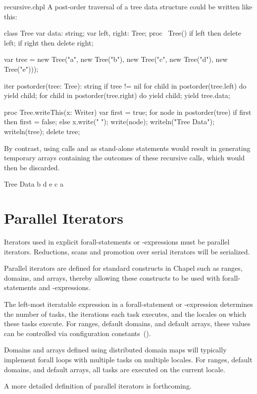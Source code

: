 \begin{chapelexample}{recursive.chpl}
A post-order traversal of a tree data structure could be written like this:
\begin{chapelnoprint}
class Tree {
  var data: string;
  var left, right: Tree;
  proc ~Tree() {
    if left then delete left;
    if right then delete right;
  }
}

var tree = new Tree("a", new Tree("b"), new Tree("c", new Tree("d"), new Tree("e")));
\end{chapelnoprint}
\begin{chapel}
iter postorder(tree: Tree): string {
  if tree != nil {
    for child in postorder(tree.left) do
      yield child;
    for child in postorder(tree.right) do
      yield child;
    yield tree.data;
  }
}
\end{chapel}
\begin{chapelnoprint}
proc Tree.writeThis(x: Writer)
{
  var first = true;
  for node in postorder(tree) {
    if first then first = false;
      else x.write(" ");
    write(node);
  }
}
writeln("Tree Data");
writeln(tree);
delete tree;
\end{chapelnoprint}
By contrast, using calls 
and  as stand-alone statements would
result in generating temporary arrays containing the outcomes of these
recursive calls, which would then be discarded.
\begin{chapeloutput}
Tree Data
b d e c a
\end{chapeloutput}
\end{chapelexample}

\section{Parallel Iterators}
\label{Parallel_Iterators}

Iterators used in explicit forall-statements or -expressions must be
parallel iterators.  Reductions, scans and promotion over serial
iterators will be serialized.

Parallel iterators are defined for standard constructs in Chapel such
as ranges, domains, and arrays, thereby allowing these constructs to
be used with forall-statements and -expressions.

The left-most iteratable expression in a forall-statement or
-expression determines the number of tasks, the iterations each task
executes, and the locales on which these tasks execute.  For ranges,
default domains, and default arrays, these values can be controlled
via configuration constants~().

Domains and arrays defined using distributed domain maps will
typically implement forall loops with multiple tasks on multiple
locales.  For ranges, default domains, and default arrays, all tasks
are executed on the current locale.

A more detailed definition of parallel iterators is forthcoming.
